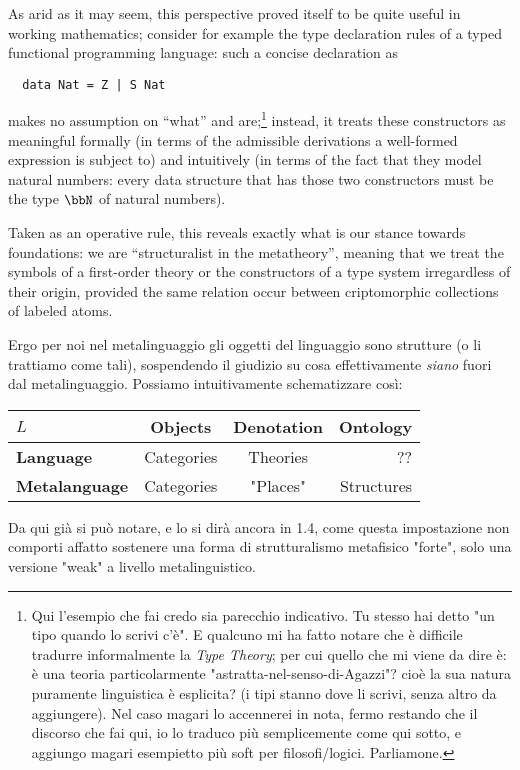 As arid as it may seem, this perspective proved itself to be quite useful in working mathematics; consider for example the type declaration rules of a typed functional programming language: such a concise declaration as
\begin{verbatim}
  data Nat = Z | S Nat
\end{verbatim}
makes no assumption on ``what''  and  are;\footnote{Qui l'esempio che fai credo sia parecchio indicativo. Tu stesso hai detto "un tipo quando lo scrivi c'è". E qualcuno mi ha fatto notare che è difficile tradurre informalmente la \emph{Type Theory}; per cui quello che mi viene da dire è: è una teoria particolarmente "astratta-nel-senso-di-Agazzi"? cioè la sua natura puramente linguistica è esplicita? (i tipi stanno dove li scrivi, senza altro da aggiungere). Nel caso magari lo accennerei in nota, fermo restando che il discorso che fai qui, io lo traduco più semplicemente come qui sotto, e aggiungo magari esempietto più soft per filosofi/logici. Parliamone.} instead, it treats these constructors as meaningful formally (in terms of the admissible derivations a well-formed expression is subject to) and intuitively (in terms of the fact that they model natural numbers: every data structure that has those two constructors must be the type $\bbN$ of natural numbers).

Taken as an operative rule, this reveals exactly what is our stance towards foundations: we are ``structuralist in the metatheory'', meaning that we treat the symbols of a first-order theory or the constructors of a type system irregardless of their origin, provided the same relation occur between criptomorphic collections of labeled atoms.

Ergo per noi nel metalinguaggio gli oggetti del linguaggio sono strutture (o li trattiamo come tali), sospendendo il giudizio su cosa effettivamente \emph{siano} fuori dal metalinguaggio. Possiamo intuitivamente schematizzare così:
 \begin{center}
 	\begin{tabular}{lccr}\toprule 
 		$L$ & Objects & Denotation & Ontology \\
 		\midrule
 		\textbf{Language} & Categories & Theories & ?? \\
 		\midrule
 		\textbf{Metalanguage} & Categories & "Places" & Structures 
 	\end{tabular} 
 \end{center}
Da qui già si può notare, e lo si dirà ancora in 1.4, come questa impostazione non comporti affatto sostenere una forma di strutturalismo metafisico "forte", solo una versione "weak" a livello metalinguistico. 

